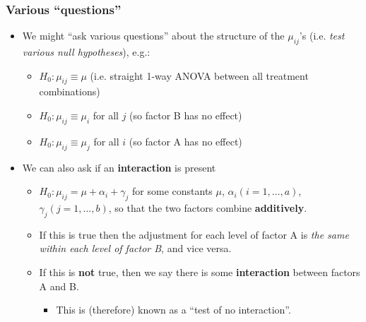 \documentclass[a4paper]{article}
\begin{document}
\subsubsection{Various ``questions''}
\begin{itemize}
	\item We might ``ask various questions'' about the structure of the \( \mu_{ij} \)'s (i.e. \textit{test various null hypotheses}), e.g.:
	\begin{itemize}
		\item \( H_0: \mu_{ij}\equiv\mu \) (i.e. straight 1-way ANOVA between all treatment combinations)
		\item \( H_0: \mu_{ij}\equiv\mu_i \) for all \( j \) (so factor B has no effect)
		\item \( H_0: \mu_{ij}\equiv\mu_j \) for all \( i \) (so factor A has no effect)
	\end{itemize}
	\item We can also ask if an \textbf{interaction} is present
	\begin{itemize}
		\item \( H_0: \mu_{ij}=\mu+\alpha_i+\gamma_j \) for some constants \( \mu \), \( \alpha_i (i=1,\dotsc,a) \), \( \gamma_j(j=1,\dotsc,b) \), so that the two factors combine \textbf{additively}.
		\item If this is true then the adjustment for each level of factor A is \textit{the same within each level of factor B}, and vice versa.
		\item If this is \textbf{not} true, then we say there is some \textbf{interaction} between factors A and B.
		\begin{itemize}
			\item This is (therefore) known as a ``test of no interaction''.
		\end{itemize}
	\end{itemize}
\end{itemize}
\end{document}
